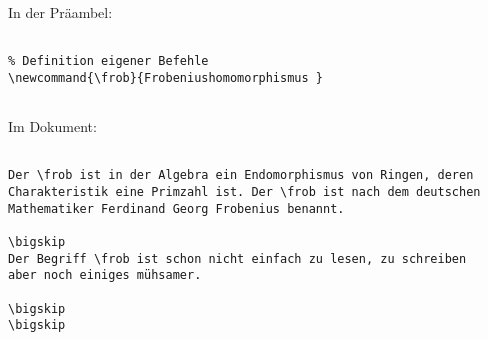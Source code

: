 
In der Präambel:

\begin{verbatim}

% Definition eigener Befehle
\newcommand{\frob}{Frobeniushomomorphismus }


\end{verbatim}

\tcblower

Im Dokument: 

\begin{verbatim}

Der \frob ist in der Algebra ein Endomorphismus von Ringen, deren
Charakteristik eine Primzahl ist. Der \frob ist nach dem deutschen
Mathematiker Ferdinand Georg Frobenius benannt.

\bigskip 
Der Begriff \frob ist schon nicht einfach zu lesen, zu schreiben
aber noch einiges mühsamer. 

\bigskip
\bigskip 

\end{verbatim}

